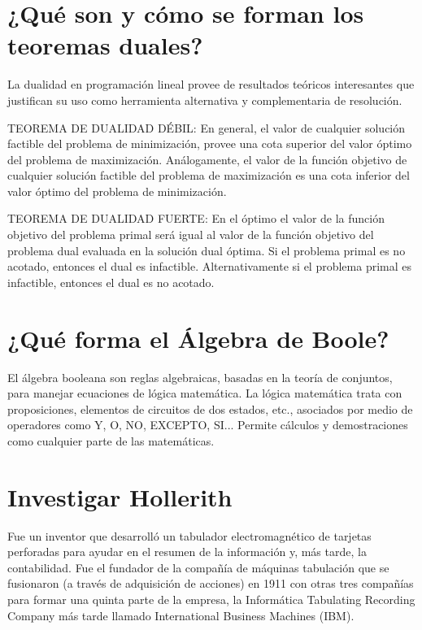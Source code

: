 \documentclass{mylib/reporte}
\begin{document}
\section{¿Qué son y cómo se forman los teoremas duales?}

La dualidad en programación lineal provee de resultados teóricos interesantes que justifican su uso como herramienta alternativa y complementaria de resolución.

TEOREMA DE DUALIDAD DÉBIL: En general, el valor de cualquier solución factible del problema de minimización, provee una cota superior del valor óptimo del problema de maximización. Análogamente, el valor de la función objetivo de cualquier solución factible del problema de maximización es una cota inferior del valor óptimo del problema de minimización.

TEOREMA DE DUALIDAD FUERTE: En el óptimo el valor de la función objetivo del problema primal será igual al valor de la función objetivo del problema dual evaluada en la solución dual óptima. Si el problema primal es no acotado, entonces el dual es infactible. Alternativamente si el problema primal es infactible, entonces el dual es no acotado.

\section{¿Qué forma el Álgebra de Boole?}

El álgebra booleana son reglas algebraicas, basadas en la teoría de conjuntos,
para manejar ecuaciones de lógica matemática.
 La lógica matemática trata con proposiciones, elementos de circuitos de dos estados,
etc., asociados por medio de operadores como Y, O, NO, EXCEPTO, SI...
 Permite cálculos y demostraciones como cualquier parte de las matemáticas.

\section{Investigar Hollerith}

Fue un inventor que desarrolló un tabulador electromagnético de tarjetas perforadas para ayudar en el resumen de la información y, más tarde, la contabilidad. Fue el fundador de la compañía de máquinas tabulación que se fusionaron (a través de adquisición de acciones) en 1911 con otras tres compañías para formar una quinta parte de la empresa, la Informática Tabulating Recording Company más tarde llamado International Business Machines (IBM).
\end{document}
